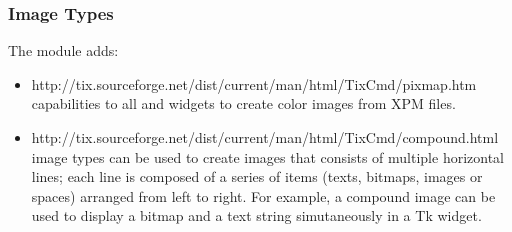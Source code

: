 



\subsubsection{Image Types}

The  module adds:
\begin{itemize}
\item 
{}
{http://tix.sourceforge.net/dist/current/man/html/TixCmd/pixmap.htm}
capabilities to all  and  widgets to
create color images from XPM files.



\item
{}
{http://tix.sourceforge.net/dist/current/man/html/TixCmd/compound.html}
image types can be used to create images that consists of multiple
horizontal lines; each line is composed of a series of items (texts,
bitmaps, images or spaces) arranged from left to right. For example, a
compound image can be used to display a bitmap and a text string
simutaneously in a Tk  widget.




\end{itemize}


